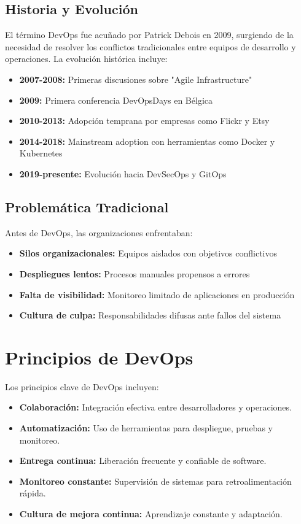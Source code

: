 \documentclass[12pt,a4paper]{article}
\begin{document}
\subsection{Historia y Evolución}
El término DevOps fue acuñado por Patrick Debois en 2009, surgiendo de la necesidad de resolver los conflictos tradicionales entre equipos de desarrollo y operaciones. La evolución histórica incluye:

\begin{itemize}
    \item \textbf{2007-2008:} Primeras discusiones sobre "Agile Infrastructure"
    \item \textbf{2009:} Primera conferencia DevOpsDays en Bélgica
    \item \textbf{2010-2013:} Adopción temprana por empresas como Flickr y Etsy
    \item \textbf{2014-2018:} Mainstream adoption con herramientas como Docker y Kubernetes
    \item \textbf{2019-presente:} Evolución hacia DevSecOps y GitOps
\end{itemize}

\subsection{Problemática Tradicional}
Antes de DevOps, las organizaciones enfrentaban:
\begin{itemize}
    \item \textbf{Silos organizacionales:} Equipos aislados con objetivos conflictivos
    \item \textbf{Despliegues lentos:} Procesos manuales propensos a errores
    \item \textbf{Falta de visibilidad:} Monitoreo limitado de aplicaciones en producción
    \item \textbf{Cultura de culpa:} Responsabilidades difusas ante fallos del sistema
\end{itemize}

\section{Principios de DevOps}
Los principios clave de DevOps incluyen:
\begin{itemize}
    \item \textbf{Colaboración:} Integración efectiva entre desarrolladores y operaciones.
    \item \textbf{Automatización:} Uso de herramientas para despliegue, pruebas y monitoreo.
    \item \textbf{Entrega continua:} Liberación frecuente y confiable de software.
    \item \textbf{Monitoreo constante:} Supervisión de sistemas para retroalimentación rápida.
    \item \textbf{Cultura de mejora continua:} Aprendizaje constante y adaptación.
\end{itemize}
\end{document}
